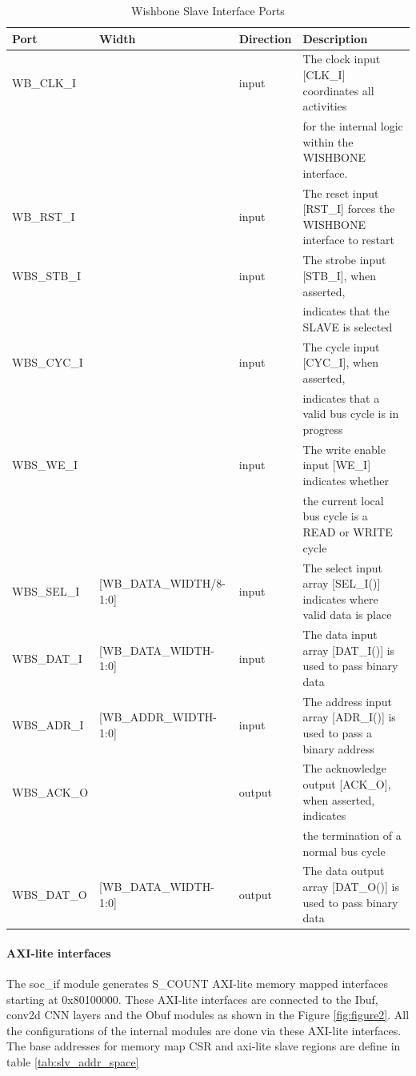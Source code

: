 \begin{table}[hbt]
\caption{Wishbone Slave Interface Ports}
\begin{tabular}{|l|l|l|l|}
\toprule
Port  & Width &Direction & Description  \\
\midrule
	\hline WB\_CLK\_I & & input & The clock input [CLK\_I] coordinates all activities \\ & & & for the internal logic within the
WISHBONE interface.\\
	\hline WB\_RST\_I & & input & The reset input [RST\_I] forces the WISHBONE interface to restart\\
	\hline WBS\_STB\_I&  & input & The strobe input [STB\_I], when asserted, \\  & & &  indicates that the SLAVE is selected\\
	\hline WBS\_CYC\_I&  & input & The cycle input [CYC\_I], when asserted,  \\  & & & indicates that a valid bus cycle is in progress\\
	\hline WBS\_WE\_I & & input & The write enable input [WE\_I] indicates whether  \\  & & & the current local bus cycle is  a READ or
WRITE cycle\\
	\hline WBS\_SEL\_I&  [WB\_DATA\_WIDTH/8-1:0] & input & The select input array [SEL\_I()] indicates where valid data is place\\
	\hline WBS\_DAT\_I& [WB\_DATA\_WIDTH-1:0] & input & The data input array [DAT\_I()] is used to pass binary data\\
	\hline WBS\_ADR\_I& [WB\_ADDR\_WIDTH-1:0] & input & The address input array [ADR\_I()] is used to pass a binary address \\
	\hline WBS\_ACK\_O&  & output & The acknowledge output [ACK\_O], when asserted, indicates  \\  & & &  the termination of a normal
bus cycle\\
	\hline WBS\_DAT\_O&  [WB\_DATA\_WIDTH-1:0]& output & The data output array [DAT\_O()] is used to pass binary data\\
\bottomrule
\end{tabular}
\label{tab:socif_northbound}
\end{table}

\paragraph{AXI-lite interfaces} 
The soc\_if module generates S\_COUNT AXI-lite memory mapped interfaces
starting at 0x80100000. These AXI-lite interfaces are connected to the Ibuf,
conv2d CNN layers and the Obuf modules as shown in the Figure \ref{fig:figure2}. All the
configurations of the internal modules are done via these AXI-lite
interfaces.\\
The  base addresses for memory map CSR and axi-lite slave regions are define in table \ref{tab:slv_addr_space}


